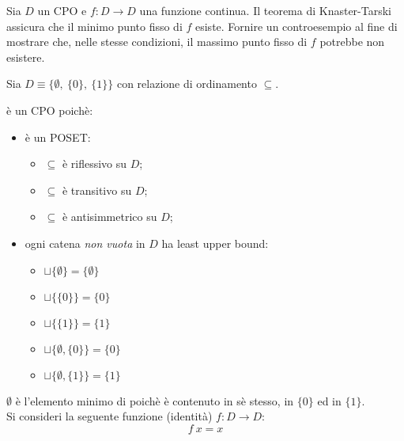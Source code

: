 \newcommand{\lt}{\ensuremath{\subseteq}}

{
  Sia $D$ un CPO e $f: D \to D$ una funzione continua. Il teorema di
  Knaster-Tarski assicura che il minimo punto fisso di $f$ esiste.
  Fornire un controesempio al fine di mostrare che, nelle stesse condizioni, il
  massimo punto fisso di $f$ potrebbe non esistere.
}
{
}

Sia $D \equiv \{\emptyset,\ \{0\},\ \{1\}\}$ con relazione di ordinamento
$\lt$.

\setRel{D}{\lt} è un CPO poichè:
\begin{itemize}
  \item \setRel{D}{\lt} è un POSET:
  \begin{itemize}
    \item $\lt$ è riflessivo su $D$;
    \item $\lt$ è transitivo su $D$;
    \item $\lt$ è antisimmetrico su $D$;
  \end{itemize}
  \item ogni catena \emph{non vuota} in $D$ ha least upper bound:
  \begin{itemize}
    \item $\sqcup\{\emptyset\} = \{\emptyset\}$
    \item $\sqcup\{\{0\}\} = \{0\}$
    \item $\sqcup\{\{1\}\} = \{1\}$
    \item $\sqcup\{\emptyset, \{0\}\} = \{0\}$
    \item $\sqcup\{\emptyset, \{1\}\} = \{1\}$
  \end{itemize}
\end{itemize}

$\emptyset$ è l'elemento minimo di \setRel{D}{\lt} poichè
è contenuto in sè stesso, in $\{0\}$ ed in $\{1\}$.
\\
Si consideri la seguente funzione (identità) $f: D \to D$:
$$
f\ x = x
$$

